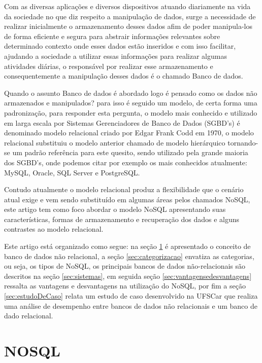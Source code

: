 \documentclass[12pt]{article}
\begin{document}
Com as diversas aplicações e diversos dispositivos atuando diariamente na vida da sociedade no que diz respeito a manipulação de dados, surge a necessidade de realizar inicialmente o armazenamento desses dados afim de poder manipula-los de forma eficiente e segura para abstrair informações relevantes sobre determinado contexto onde esses dados estão inseridos e com isso facilitar, ajudando a sociedade a utilizar essas informações para realizar algumas atividades diárias, o responsável por realizar esse armazenamento e consequentemente a manipulação desses dados é o chamado Banco de dados.

Quando o assunto Banco de dados é abordado logo é pensado como os dados não armazenados e manipulados? para isso é seguido um modelo, de certa forma uma padronização, para responder esta pergunta, o modelo mais conhecido e utilizado em larga escala por Sistemas Gerenciadores de Banco de Dados (SGBD's) é denominado modelo relacional \cite{codd:1970} criado por Edgar Frank Codd em 1970, o modelo relacional substituiu o modelo anterior chamado de modelo hierárquico tornando-se um padrão referência para este quesito, sendo utilizado pela grande maioria dos SGBD's, onde podemos citar por exemplo os mais conhecidos atualmente: MySQL, Oracle, SQL Server e PostgreSQL.\cite{brito2010bancos}

Contudo atualmente o modelo relacional produz a flexibilidade que o cenário atual exige e vem sendo substituído em algumas áreas pelos chamados NoSQL, este artigo tem como foco abordar o modelo NoSQL apresentando suas características, formas de armazenamento e recuperação dos dados e alguns contrastes ao modelo relacional.

Este artigo está organizado como segue: na seção \ref{sec:nosql} é apresentado o conceito de banco de dados não relacional, a seção \ref{sec:categorizacao} envatiza as categorias, ou seja, os tipos de NoSQL, os principais bancos de dados não-relacionais são descritos na seção \ref{sec:sistemas}, em seguida seção \ref{sec:vantagensedesvantagens} ressalta as vantagens e desvantagens na utilização do NoSQL, por fim a seção \ref{sec:estudoDeCaso} relata um estudo de caso desenvolvido na UFSCar que realiza uma análise de desempenho entre bancos de dados não relacionais e um banco de dado relacional.

\section{NOSQL} 
\label{sec:nosql}
\end{document}
